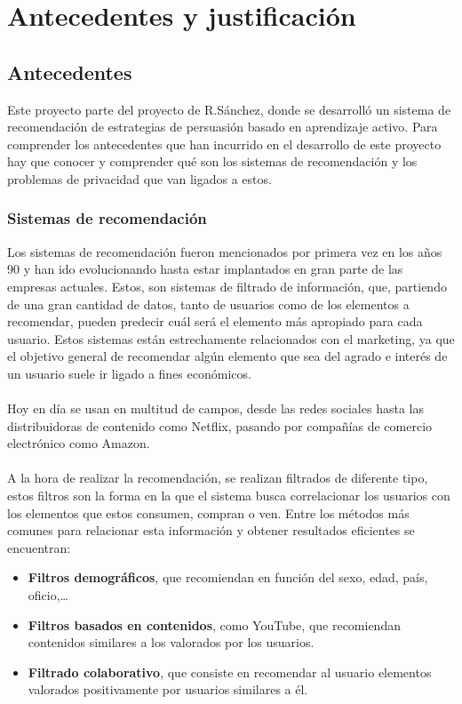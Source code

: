 \chapter{Antecedentes y justificación}
\thispagestyle{fancy}

\section{Antecedentes}
Este proyecto parte del proyecto de R.Sánchez\autocite{sanchez-corcueraPersuasionbasedRecommenderSystem2020}, donde se desarrolló un sistema de recomendación de estrategias de persuasión basado en aprendizaje activo. Para comprender los antecedentes que han incurrido en el desarrollo de este proyecto hay que conocer y comprender qué son los sistemas de recomendación y los problemas de privacidad que van ligados a estos. 
\subsection{Sistemas de recomendación}
Los sistemas de recomendación fueron mencionados por primera vez en los años 90 y han ido evolucionando hasta estar implantados en gran parte de las empresas actuales. Estos, son sistemas de filtrado de información, que, partiendo de una gran cantidad de datos, tanto de usuarios como de los elementos a recomendar, pueden predecir cuál será el elemento más apropiado para cada usuario. Estos sistemas están estrechamente relacionados con el marketing, ya que el objetivo general de recomendar algún elemento que sea del agrado e interés de un usuario suele ir ligado a fines económicos.
\\ \\
Hoy en día se usan en multitud de campos, desde las redes sociales hasta las distribuidoras de contenido como Netflix, pasando por compañías de comercio electrónico como Amazon. 
\\ \\
A la hora de realizar la recomendación, se realizan filtrados de diferente tipo, estos filtros son la forma en la que el sistema busca correlacionar los usuarios con los elementos que estos consumen, compran o ven. Entre los métodos más comunes para relacionar esta información y obtener resultados eficientes se encuentran:
\begin{itemize}
    \item \textbf{Filtros demográficos}, que recomiendan en función del sexo, edad, país, oficio,… 
    \item \textbf{Filtros basados en contenidos}, como YouTube, que recomiendan contenidos similares a los valorados por los usuarios. 
    \item \textbf{Filtrado colaborativo}, que consiste en recomendar al usuario elementos valorados positivamente por usuarios similares a él. 
\end{itemize}

